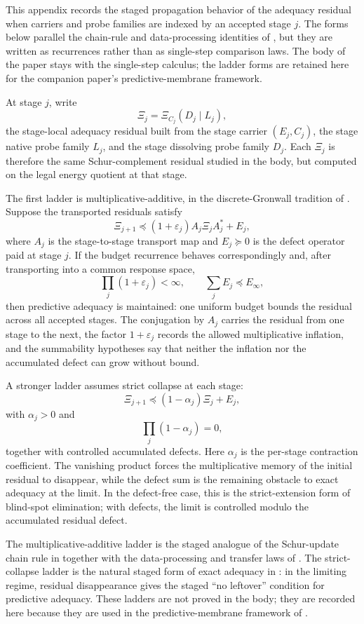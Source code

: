 \documentclass[11pt]{article}
\newcommand{\preceqq}{\preceq}
\newcommand{\eps}{\varepsilon}
\theoremstyle{definition}
\begin{document}
This appendix records the staged propagation behavior of the adequacy residual
when carriers and probe families are indexed by an accepted stage \(j\).  The
forms below parallel the chain-rule and data-processing identities of
, but they are written as recurrences
rather than as single-step comparison laws.  The body of the paper stays with
the single-step calculus; the ladder forms are retained here for the companion
paper's predictive-membrane framework.

At stage \(j\), write
\[
  \Xi_j=\Xi_{C_j}(D_j\mid L_j),
\]
the stage-local adequacy residual built from the stage carrier
\((E_j,C_j)\), the stage native probe family \(L_j\), and the stage
dissolving probe family \(D_j\).  Each \(\Xi_j\) is therefore the same
Schur-complement residual studied in the body, but computed on the legal
energy quotient at that stage.

The first ladder is multiplicative-additive, in the discrete-Gronwall
tradition of \citet{Pachpatte1998Inequalities}.  Suppose the transported
residuals satisfy
\[
  \Xi_{j+1}\preceqq (1+\eps_j)A_j\Xi_j A_j^*+E_j,
\]
where \(A_j\) is the stage-to-stage transport map and \(E_j\succeq 0\) is
the defect operator paid at stage \(j\).  If the budget recurrence behaves
correspondingly and, after transporting into a common response space,
\[
  \prod_j(1+\eps_j)<\infty,
  \qquad
  \sum_j E_j\preceqq E_\infty,
\]
then predictive adequacy is maintained: one uniform budget bounds the
residual across all accepted stages.  The conjugation by \(A_j\) carries the
residual from one stage to the next, the factor \(1+\eps_j\) records the
allowed multiplicative inflation, and the summability hypotheses say that
neither the inflation nor the accumulated defect can grow without bound.

A stronger ladder assumes strict collapse at each stage:
\[
  \Xi_{j+1}\preceqq (1-\alpha_j)\Xi_j+E_j,
\]
with \(\alpha_j>0\) and
\[
  \prod_j(1-\alpha_j)=0,
\]
together with controlled accumulated defects.  Here \(\alpha_j\) is the
per-stage contraction coefficient.  The vanishing product forces the
multiplicative memory of the initial residual to disappear, while the defect
sum is the remaining obstacle to exact adequacy at the limit.  In the
defect-free case, this is the strict-extension form of blind-spot elimination;
with defects, the limit is controlled modulo the accumulated residual defect.

The multiplicative-additive ladder is the staged analogue of the Schur-update
chain rule in  together with the data-processing and
transfer laws of .  The strict-collapse ladder is
the natural staged form of exact adequacy in : in
the limiting regime, residual disappearance gives the staged ``no leftover''
condition for predictive adequacy.  These ladders are not proved in the body;
they are recorded here because they are used in the predictive-membrane
framework of \citet{Tsiokos2026NeedleKiller}.
 
\clearpage


\end{document}
